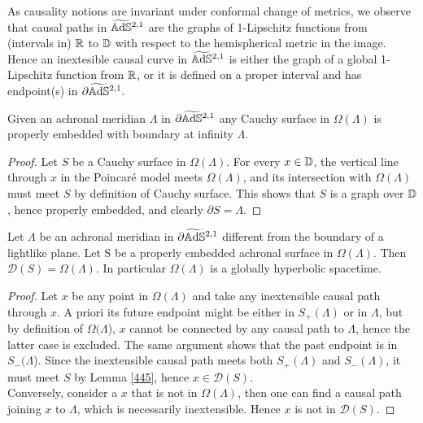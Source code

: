\begin{observation}
    As causality notions are invariant under conformal change of metrics, we observe that causal paths in $\widetilde{\mathbb{A}\mathrm{d}\mathbb{S}}{}^{2,1}$ are the graphs of 1-Lipschitz functions from (intervals in) $\mathbb{R}$ to $\mathbb{D}$ with respect to the hemispherical metric in the image. Hence an inextesible causal curve in $\widetilde{\mathbb{A}\mathrm{d}\mathbb{S}}{}^{2,1}$ is either the graph of a global 1-Lipschitz function from $\mathbb{R}$, or it is defined on a proper interval and has endpoint(s) in $\partial\widetilde{\mathbb{A}\mathrm{d}\mathbb{S}}{}^{2,1}.$
\end{observation}

\begin{lemma}\label{445}
    Given an achronal meridian $\Lambda$ in $\partial\widetilde{\mathbb{A}\mathrm{d}\mathbb{S}}{}^{2,1}$ any Cauchy surface in $\Omega(\Lambda)$ is properly embedded with boundary at infinity $\Lambda$. 
\end{lemma}
\begin{proof}
    Let $S$ be a Cauchy surface in $\Omega(\Lambda)$. For every $x\in \mathbb{D}$, the vertical line through $x$ in the Poincaré model meets $\Omega(\Lambda)$, and its intersection with $\Omega(\Lambda)$ must meet $S$ by definition of Cauchy surface. This shows that $S$ is a graph over $\mathbb{D}$, hence properly embedded, and clearly $\partial S=\Lambda.$
\end{proof}

\begin{proposition}\label{446}
    Let $\Lambda$ be an achronal meridian in $\partial\widetilde{\mathbb{A}\mathrm{d}\mathbb{S}}{}^{2,1}$ different from the boundary of a lightlike plane. Let S be a properly embedded achronal surface in $\Omega(\Lambda)$. Then $\mathcal{D}(S)=\Omega(\Lambda)$. In particular $\Omega(\Lambda)$ is a globally hyperbolic spacetime.
\end{proposition}
\begin{proof}
    Let $x$ be any point in $\Omega(\Lambda)$ and take any inextensible causal path through $x$. A priori its future endpoint might be either in $S_+(\Lambda)$ or in $\Lambda$, but by definition of $\Omega(\Lambda$), $x$ cannot be connected by any causal path to $\Lambda$, hence the latter case is excluded. The same argument shows that the past endpoint is in $S_-(\Lambda$). Since the inextensible causal path meets both $S_+(\Lambda)$ and $S_-(\Lambda)$, it must meet $S$ by Lemma \ref{445}, hence $x\in\mathcal{D}(S)$. \\
    Conversely, consider a $x$ that is not in $\Omega(\Lambda)$, then one can find a causal path joining $x$ to $\Lambda$, which is necessarily inextensible. Hence $x$ is not in $\mathcal{D}(S)$.  
\end{proof}

